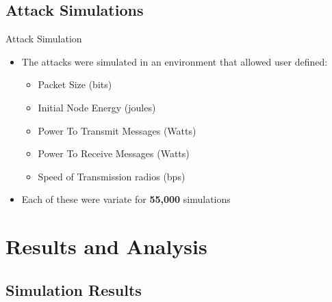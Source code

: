 \documentclass{beamer}
\begin{document}
\subsection{Attack Simulations}

\begin{frame}{Attack Simulation}
	\begin{itemize}
	\item The attacks were simulated in an environment that allowed user defined: 
	\begin{itemize}
		\item Packet Size (bits)
		\item Initial Node Energy (joules)
		\item Power To Transmit Messages (Watts)
		\item Power To Receive Messages (Watts)
		\item Speed of Transmission radios (bps)
	\end{itemize}
	\item Each of these were variate for \textbf{55,000} simulations
	\end{itemize}
\end{frame}



\section{Results and Analysis}

\subsection{Simulation Results}
\end{document}
